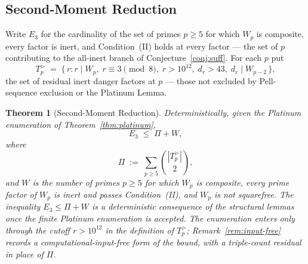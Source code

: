 \documentclass[11pt]{amsart}
\theoremstyle{plain}
\newtheorem{theorem}{Theorem}[section]
\theoremstyle{definition}
\theoremstyle{remark}
\numberwithin{equation}{section}
\begin{document}
\subsection{Second-Moment Reduction}\label{sec:second-moment}

Write $E_3$ for the cardinality of the set of primes $p \geq 5$ for which $W_p$ is composite, every factor is inert, and Condition~(II) holds at every factor --- the set of $p$ contributing to the all-inert branch of Conjecture~\ref{conj:suff}. For each $p$ put
\[
  T_p^{>} \;=\; \{\,r : r \mid W_p,\; r \equiv 3 \pmod 8,\; r > 10^{12},\; d_r > 43,\; d_r \mid W_{p-2}\,\},
\]
the set of residual inert danger factors at $p$ --- those not excluded by Pell-sequence exclusion or the Platinum Lemma.

\begin{theorem}[Second-Moment Reduction]\label{thm:second-moment}
Deterministically, given the Platinum enumeration of Theorem~\ref{thm:platinum},
\[
  E_3 \;\leq\; \Pi + W,
\]
where
\[
  \Pi \;:=\; \sum_{p \geq 5} \binom{|T_p^{>}|}{2},
\]
 and $W$ is the number of primes $p \geq 5$ for which $W_p$ is composite, every prime factor of $W_p$ is inert and passes Condition~(II), and $W_p$ is not squarefree. The inequality $E_3 \leq \Pi + W$ is a deterministic consequence of the structural lemmas once the finite Platinum enumeration is accepted. The enumeration enters only through the cutoff $r > 10^{12}$ in the definition of $T_p^{>}$; Remark~\ref{rem:input-free} records a computational-input-free form of the bound, with a triple-count residual in place of $\Pi$.
\end{theorem}
\end{document}
